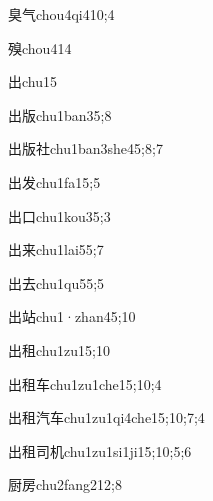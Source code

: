 \begin{verbete}{臭气}{chou4qi4}{10;4}
\end{verbete}
\begin{verbete}{殠}{chou4}{14}
\end{verbete}
\begin{verbete}{出}{chu1}{5}
\end{verbete}
\begin{verbete}{出版}{chu1ban3}{5;8}
\end{verbete}
\begin{verbete}{出版社}{chu1ban3she4}{5;8;7}
\end{verbete}
\begin{verbete}{出发}{chu1fa1}{5;5}
\end{verbete}
\begin{verbete}{出口}{chu1kou3}{5;3}
\end{verbete}
\begin{verbete}{出来}{chu1lai5}{5;7}
\end{verbete}
\begin{verbete}{出去}{chu1qu5}{5;5}
\end{verbete}
\begin{verbete}{出站}{chu1·zhan4}{5;10}
\end{verbete}
\begin{verbete}{出租}{chu1zu1}{5;10}
\end{verbete}
\begin{verbete}{出租车}{chu1zu1che1}{5;10;4}
\end{verbete}
\begin{verbete}{出租汽车}{chu1zu1qi4che1}{5;10;7;4}
\end{verbete}
\begin{verbete}{出租司机}{chu1zu1si1ji1}{5;10;5;6}
\end{verbete}
\begin{verbete}{厨房}{chu2fang2}{12;8}
\end{verbete}
